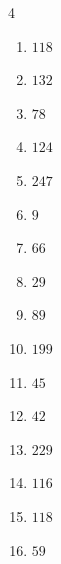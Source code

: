 \begin{multicols}{4}
\begin{enumerate}
  \item $118$


  \item $132$


  \item $78$


  \item $124$


  \item $247$


  \item $9$


  \item $66$


  \item $29$


  \item $89$


  \item $199$


  \item $45$


  \item $42$


\columnbreak %

  \item $229$


  \item $116$


  \item $118$


  \item $59$


\end{enumerate}
\end{multicols}
